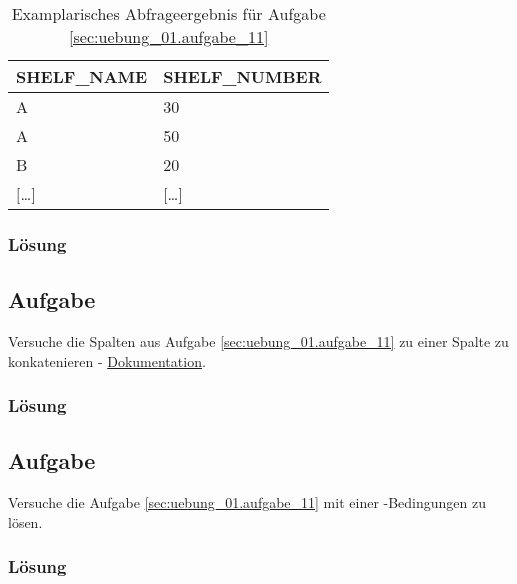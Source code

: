 \begin{table}[H]
  \ttfamily
  \begin{tabularx}{\textwidth}{X|X}
    \textbf{SHELF\_NAME} & \textbf{SHELF\_NUMBER} \\
    \hline\hline
    A & 30 \\
    A & 50 \\
    B & 20 \\
    $[$\dots$]$ & $[$\dots$]$ \\
  \end{tabularx}
  \caption{Examplarisches Abfrageergebnis für Aufgabe \ref{sec:uebung_01.aufgabe_11}}
  \label{tbl:uebung_01.aufgabe_11}
\end{table}

\subsubsection*{Lösung}
\label{sec:uebung_01.aufgabe_11.loesung}


\subsection{Aufgabe}
\label{sec:uebung_01.aufgabe_12}
Versuche die Spalten aus Aufgabe \ref{sec:uebung_01.aufgabe_11} zu einer Spalte zu konkatenieren - \href{https://docs.oracle.com/cd/B19306_01/server.102/b14200/functions026.htm}{Dokumentation}.

\subsubsection*{Lösung}
\label{sec:uebung_01.aufgabe_12.loesung}

\subsection{Aufgabe}
\label{sec:uebung_01.aufgabe_13}
Versuche die Aufgabe \ref{sec:uebung_01.aufgabe_11} mit einer -Bedingungen zu lösen.

\subsubsection*{Lösung}
\label{sec:uebung_01.aufgabe_13.loesung}

